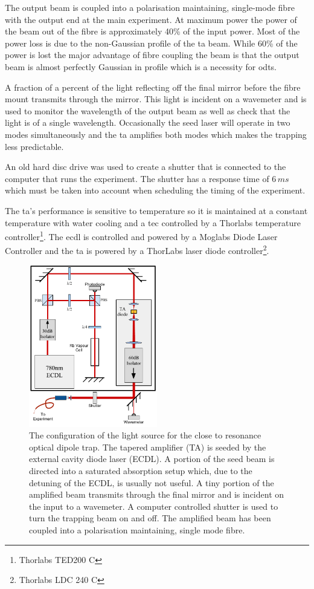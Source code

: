The output beam is coupled into a polarisation maintaining, single-mode fibre with the output end at the main experiment. At maximum power the power of the beam out of the fibre is approximately 40\% of the input power. Most of the power loss is due to the non-Gaussian profile of the \gls{ta} beam. While 60\% of the power is lost the major advantage of fibre coupling the beam is that the output beam is almost perfectly Gaussian in profile which is a necessity for \glspl{odt}.

A fraction of a percent of the light reflecting off the final mirror before the fibre mount transmits through the mirror. This light is incident on a wavemeter and is used to monitor the wavelength of the output beam as well as check that the light is of a single wavelength. Occasionally the seed laser will operate in two modes simultaneously and the \gls{ta} amplifies both modes which makes the trapping less predictable.

An old hard disc drive was used to create a shutter\cite{scholten_enhanced_2007} that is connected to the computer that runs the experiment. The shutter has a response time of $6\,\unit{ms}$ which must be taken into account when scheduling the timing of the experiment.

The \gls{ta}'s performance is sensitive to temperature so it is maintained at a constant temperature with water cooling and a \gls{tec} controlled by a Thorlabs temperature controller\footnote{Thorlabs TED200 C}. The \gls{ecdl} is controlled and powered by a Moglabs Diode Laser Controller and the \gls{ta} is powered by a ThorLabs laser diode controller\footnote{Thorlabs LDC 240 C}.

\begin{figure}[h]
\centering
\includegraphics[width=0.5\textwidth]{figs/TAsetup.pdf}
\caption{The configuration of the light source for the close to resonance optical dipole trap. The tapered amplifier (TA) is seeded by the external cavity diode laser (ECDL). A portion of the seed beam is directed into a saturated absorption setup which, due to the detuning of the ECDL, is usually not useful. A tiny portion of the amplified beam transmits through the final mirror and is incident on the input to a wavemeter. A computer controlled shutter is used to turn the trapping beam on and off. The amplified beam has been coupled into a polarisation maintaining, single mode fibre.}
\end{figure}

